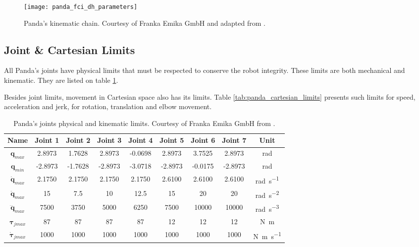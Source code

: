 \begin{figure}[htbp]
    \centering
	\texttt{[image: panda\_fci\_dh\_parameters]}
	\caption[Panda's kinematic chain.]{Panda's kinematic chain. Courtesy of Franka Emika GmbH and adapted from \cite{FrankaEmikaGmbH_fci_documentation}.}
	\label{fig:panda_fci_dh_parameters}
\end{figure}


\subsection{Joint \& Cartesian Limits}
\label{robotic_system_constraints_kinematics_joint_cartesian_limits}

All Panda's joints have physical limits that must be respected to conserve the robot integrity. These limits are both mechanical and kinematic. They are listed on table \ref{tab:panda_joint_limits}.

Besides joint limits, movement in Cartesian space also has its limits. Table \ref{tab:panda_cartesian_limits} presents such limits for speed, acceleration and jerk, for rotation, translation and elbow movement.

\begin{table}[htbp]
    \caption[Panda's joints physical and kinematic limits.]{Panda's joints physical and kinematic limits. Courtesy of Franka Emika GmbH from \cite{FrankaEmikaGmbH_fci_documentation}.}
    \centering
    \begin{tabular}{c|c|c|c|c|c|c|c|c}
        \toprule
        \textbf{Name} & \textbf{Joint 1} & \textbf{Joint 2} & \textbf{Joint 3} & \textbf{Joint 4} & \textbf{Joint 5} & \textbf{Joint 6} & \textbf{Joint 7} & \textbf{Unit} \\
        \midrule
        $\boldsymbol{q}_{max}$ & 2.8973 & 1.7628 & 2.8973  & -0.0698 & 2.8973 & 3.7525 & 2.8973 & \si{\radian}\\
        $\boldsymbol{q}_{min}$ & -2.8973 & -1.7628 & -2.8973 & -3.0718 & -2.8973 & -0.0175 & -2.8973 & \si{\radian} \\
        $\dot{\boldsymbol{q}}_{max}$ & 2.1750 & 2.1750 & 2.1750 & 2.1750 & 2.6100 & 2.6100 & 2.6100 & \si{\radian\per\second} \\
        $\ddot{\boldsymbol{q}}_{max}$ & 15 & 7.5 & 10 & 12.5 & 15 & 20 & 20 & \si{\radian\per\second\squared} \\
        $\dddot{\boldsymbol{q}}_{max}$ & 7500 &	3750 &	5000 & 6250 & 7500 & 10000 & 10000 & \si{\radian\per\second\cubed} \\
        $\boldsymbol{\tau}_{jmax}$ & 87 & 87 & 87 & 87 & 12  & 12 & 12 & \si{\newton\meter} \\
        $\dot{\boldsymbol{\tau}}_{jmax}$ & 1000 & 1000 & 1000 & 1000 & 1000 & 1000 & 1000 & \si{\newton\meter\per\second} \\
        \bottomrule
    \end{tabular}
    \label{tab:panda_joint_limits}
\end{table}

